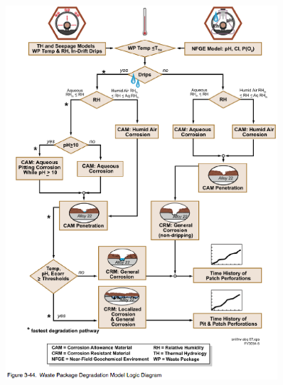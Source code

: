 \begin{frame}[ctb!]
\begin{minipage}{0.49\textwidth}
\begin{figure}[h!]
        \includegraphics[width=0.9\textwidth]{./images/model.eps}
    \end{figure}
  \end{minipage}
  

\end{frame}
